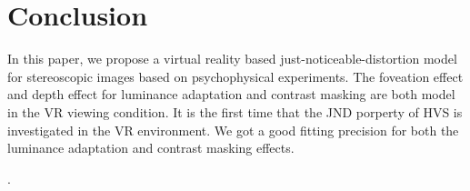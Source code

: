 \documentclass[journal]{IEEEtran}
\begin{document}
\section{Conclusion}
In this paper, we propose a virtual reality based just-noticeable-distortion model for stereoscopic images based on psychophysical experiments. The foveation effect and depth effect for luminance adaptation and contrast masking are both model in the VR viewing condition. It is the first time that the JND porperty of HVS is investigated in the VR environment. We got a good fitting precision for both the luminance adaptation and contrast masking effects.

.

\ifCLASSOPTIONcaptionsoff
  \newpage
\fi

{
	\small
	
	
}
\end{document}
